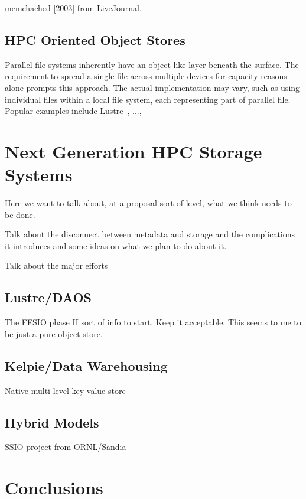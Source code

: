 memchached [2003] from LiveJournal.

\subsection{HPC Oriented Object Stores}

Parallel file systems inherently have an object-like layer beneath the surface.
The requirement to spread a single file across multiple devices for capacity
reasons alone prompts this approach. The actual implementation may vary, such
as using individual files within a local file system, each representing part
of parallel file. Popular examples include Lustre~\cite{lustre}, ...,

\section{Next Generation HPC Storage Systems}\label{sec:intro}

Here we want to talk about, at a proposal sort of level, what we think needs
to be done.

Talk about the disconnect between metadata and storage and the complications
it introduces and some ideas on what we plan to do about it.

Talk about the major efforts

\subsection{Lustre/DAOS}

The FFSIO phase II sort of info to start. Keep it acceptable. This seems to me
to be just a pure object store.

\subsection{Kelpie/Data Warehousing}

Native multi-level key-value store

\subsection{Hybrid Models}

SSIO project from ORNL/Sandia

\section{Conclusions}\label{sec:intro}

